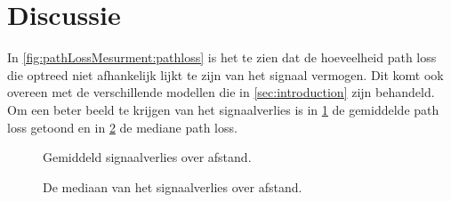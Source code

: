 \section{Discussie}


In \cref{fig:pathLossMesurment:pathloss} is het te zien dat de hoeveelheid path loss die optreed niet afhankelijk lijkt te zijn van het signaal vermogen. Dit komt ook overeen met de verschillende modellen die in \cref{sec:introduction} zijn behandeld. Om een beter beeld te krijgen van het signaalverlies is in \cref{fig:pathLossMesurment:avaragePathloss} de gemiddelde path loss getoond en in \cref{fig:pathLossMesurment:medianPathloss} de  mediane path loss.
\begin{figure}[ht]
    \centering
{}

\caption{Gemiddeld signaalverlies over afstand.}
\label{fig:pathLossMesurment:avaragePathloss}

\end{figure}
\begin{figure}[ht]
    \centering
{}

\caption{De mediaan van het signaalverlies over afstand.}
\label{fig:pathLossMesurment:medianPathloss}

\end{figure}

